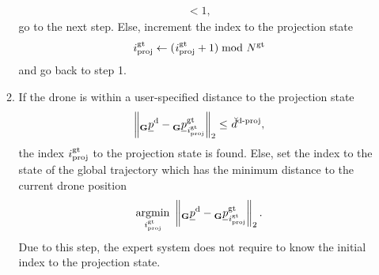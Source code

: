 \begin{itemize}
\begin{enumerate}
\begin{align}
{            } < 1,
        \end{align}
        go to the next step. 
        Else, increment the index to the projection state
        \begin{equation}
            \idx[]{\glotraj}{\proj}{}{} 
            \leftarrow 
            (\idx[]{\glotraj}{\proj}{}{} + 1) \bmod \num[]{\glotraj}{}{}{}
        \end{equation}
        and go back to step 1.
        \item If the drone is 
        within a user-specified distance to the projection state 
        \begin{equation} \label{eq:dist_drone_proj_criterion}
            \left\| 
                \pos[]{\drone}{}{\grs}{}
                - 
                \pos[]{\glotraj}{\idx[]{\glotraj}{\proj}{}{}}{\grs}{}
            \right\|_2 
            \le 
            \dist[\user]{\dronetoproj}{}{}{},
        \end{equation}
        the index 
        $\idx[]{\glotraj}{\proj}{}{}$ 
        to the projection state is found.
        Else, set the index 
        to the state of the global trajectory
        which has the minimum distance to the current drone position
        \begin{equation} \label{eq:proj_idx_with_min_dist}
            \argmin{\idx[]{\glotraj}{\proj}{}{}}
            \left\| 
                \pos[]{\drone}{}{\grs}{}
                - 
                \pos[]{\glotraj}{\idx[]{\glotraj}{\proj}{}{}}{\grs}{}
            \right\|_2.
        \end{equation}
        Due to this step,
        the expert system does not require to know
        the initial index 
        to the projection state.

    \end{enumerate}
    
    


\end{itemize}
